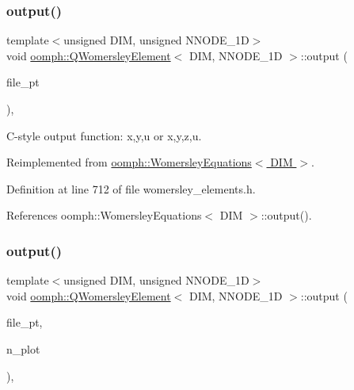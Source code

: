 \subsubsection{\texorpdfstring{output()}{output()}\hspace{0.1cm}{\footnotesize\ttfamily [3/4]}}
{\footnotesize\ttfamily template$<$unsigned D\+IM, unsigned N\+N\+O\+D\+E\+\_\+1D$>$ \\
void \hyperlink{classoomph_1_1QWomersleyElement}{oomph\+::\+Q\+Womersley\+Element}$<$ D\+IM, N\+N\+O\+D\+E\+\_\+1D $>$\+::output (\begin{DoxyParamCaption}\item[{F\+I\+LE $\ast$}]{file\+\_\+pt }\end{DoxyParamCaption})\hspace{0.3cm}{\ttfamily [inline]}, {\ttfamily [virtual]}}



C-\/style output function\+: x,y,u or x,y,z,u. 



Reimplemented from \hyperlink{classoomph_1_1WomersleyEquations_ab317caeb41aefe218596c1ff1c39d40f}{oomph\+::\+Womersley\+Equations$<$ D\+I\+M $>$}.



Definition at line 712 of file womersley\+\_\+elements.\+h.



References oomph\+::\+Womersley\+Equations$<$ D\+I\+M $>$\+::output().

\mbox{\label{classoomph_1_1QWomersleyElement_aedac8e0c2b41e446b7c835731b179255}} 
\subsubsection{\texorpdfstring{output()}{output()}\hspace{0.1cm}{\footnotesize\ttfamily [4/4]}}
{\footnotesize\ttfamily template$<$unsigned D\+IM, unsigned N\+N\+O\+D\+E\+\_\+1D$>$ \\
void \hyperlink{classoomph_1_1QWomersleyElement}{oomph\+::\+Q\+Womersley\+Element}$<$ D\+IM, N\+N\+O\+D\+E\+\_\+1D $>$\+::output (\begin{DoxyParamCaption}\item[{F\+I\+LE $\ast$}]{file\+\_\+pt,  }\item[{const unsigned \&}]{n\+\_\+plot }\end{DoxyParamCaption})\hspace{0.3cm}{\ttfamily [inline]}, {\ttfamily [virtual]}}




